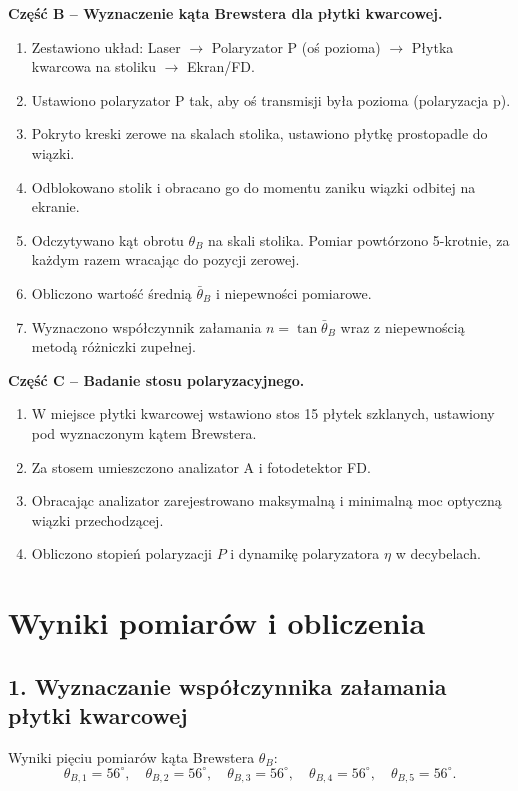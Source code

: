 \documentclass[a4paper,12pt]{article}
\begin{document}
\textbf{Część B -- Wyznaczenie kąta Brewstera dla płytki kwarcowej.}
\begin{enumerate}
  \item Zestawiono układ: Laser $\to$ Polaryzator P (oś pozioma) $\to$ Płytka kwarcowa
  na stoliku $\to$ Ekran/FD.
  \item Ustawiono polaryzator P tak, aby oś transmisji była pozioma (polaryzacja p).
  \item Pokryto kreski zerowe na skalach stolika, ustawiono płytkę prostopadle do wiązki.
  \item Odblokowano stolik i obracano go do momentu zaniku wiązki odbitej na ekranie.
  \item Odczytywano kąt obrotu $\theta_B$ na skali stolika. Pomiar powtórzono 5-krotnie,
  za każdym razem wracając do pozycji zerowej.
  \item Obliczono wartość średnią $\bar{\theta}_B$ i niepewności pomiarowe.
  \item Wyznaczono współczynnik załamania $n = \tan\bar{\theta}_B$ wraz z niepewnością
  metodą różniczki zupełnej.
\end{enumerate}

\textbf{Część C -- Badanie stosu polaryzacyjnego.}
\begin{enumerate}
  \item W miejsce płytki kwarcowej wstawiono stos 15 płytek szklanych, ustawiony
  pod wyznaczonym kątem Brewstera.
  \item Za stosem umieszczono analizator A i fotodetektor FD.
  \item Obracając analizator zarejestrowano maksymalną i minimalną moc optyczną
  wiązki przechodzącej.
  \item Obliczono stopień polaryzacji $P$ i dynamikę polaryzatora $\eta$ w decybelach.
\end{enumerate}

\section*{Wyniki pomiarów i obliczenia}

\subsection*{1. Wyznaczanie współczynnika załamania płytki kwarcowej}

Wyniki pięciu pomiarów kąta Brewstera $\theta_B$:
\[
\theta_{B,1} = 56^\circ,\quad
\theta_{B,2} = 56^\circ,\quad
\theta_{B,3} = 56^\circ,\quad
\theta_{B,4} = 56^\circ,\quad
\theta_{B,5} = 56^\circ.
\]
\end{document}
